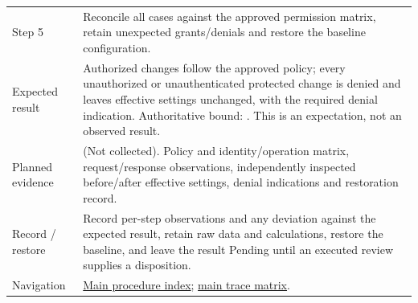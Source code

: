 \begin{tabularx}{\linewidth}{L{3.2cm}Y}
Step 5 & Reconcile all cases against the approved permission matrix, retain unexpected grants/denials and restore the baseline configuration.\\
Expected result & Authorized changes follow the approved policy; every unauthorized or unauthenticated protected change is denied and leaves effective settings unchanged, with the required denial indication. Authoritative bound: . This is an expectation, not an observed result.\\
Planned evidence &  (Not collected). Policy and identity/operation matrix, request/response observations, independently inspected before/after effective settings, denial indications and restoration record.\\
Record / restore & Record per-step observations and any deviation against the expected result, retain raw data and calculations, restore the baseline, and leave the result Pending until an executed review supplies a disposition.\\
Navigation & \hyperref[Table:WeekTwoTests]{Main procedure index}; \hyperref[Table:TraceabilityMatrix]{main trace matrix}.\\
\end{tabularx}
\normalsize

